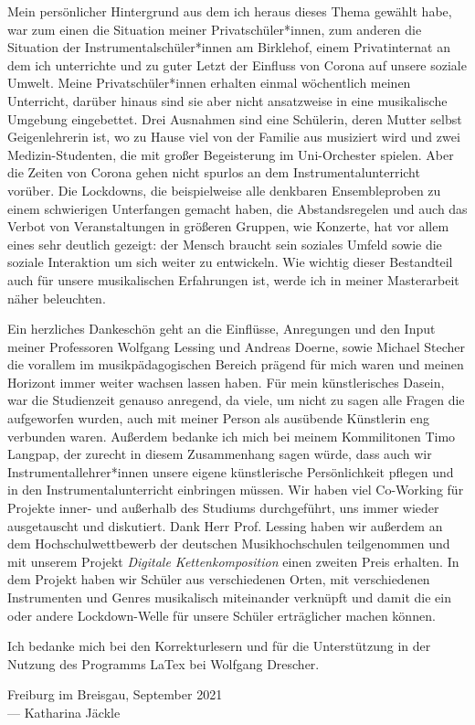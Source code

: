 
Mein persönlicher Hintergrund aus dem ich heraus dieses Thema gewählt habe, war
zum einen die Situation meiner Privatschüler*innen, zum anderen die Situation der
Instrumentalschüler*innen am Birklehof, einem Privatinternat an dem ich unterrichte
und zu guter Letzt der Einfluss von Corona auf unsere soziale Umwelt. Meine
Privatschüler*innen erhalten einmal wöchentlich meinen Unterricht, darüber hinaus sind
sie aber nicht ansatzweise in eine musikalische Umgebung eingebettet. Drei
Ausnahmen sind eine Schülerin, deren Mutter selbst Geigenlehrerin ist, wo zu
Hause viel von der Familie aus musiziert wird und zwei Medizin-Studenten, die
mit großer Begeisterung im Uni-Orchester spielen. Aber die Zeiten von Corona
gehen nicht spurlos an dem Instrumentalunterricht vorüber. Die Lockdowns, die
beispielweise alle denkbaren Ensembleproben zu einem schwierigen Unterfangen
gemacht haben, die Abstandsregelen und auch das Verbot von Veranstaltungen in
größeren Gruppen, wie Konzerte, hat vor allem eines sehr deutlich gezeigt: der
Mensch braucht sein soziales Umfeld sowie die soziale Interaktion um sich weiter
zu entwickeln. Wie wichtig dieser Bestandteil auch für unsere musikalischen
Erfahrungen ist, werde ich in meiner Masterarbeit näher beleuchten.

Ein herzliches Dankeschön geht an die Einflüsse, Anregungen und den Input meiner
Professoren Wolfgang Lessing und Andreas Doerne, sowie Michael Stecher die
vorallem im musikpädagogischen Bereich prägend für mich waren und meinen
Horizont immer weiter wachsen lassen haben. Für mein künstlerisches Dasein, war
die Studienzeit genauso anregend, da viele, um nicht zu sagen alle Fragen die
aufgeworfen wurden, auch mit meiner Person als ausübende Künstlerin eng
verbunden waren. Außerdem bedanke ich mich bei meinem Kommilitonen Timo Langpap,
der zurecht in diesem Zusammenhang sagen würde, dass auch wir Instrumentallehrer*innen
unsere eigene künstlerische Persönlichkeit pflegen und in den
Instrumentalunterricht einbringen müssen. Wir haben viel Co-Working für Projekte
inner- und außerhalb des Studiums durchgeführt, uns immer wieder ausgetauscht und
diskutiert.
Dank Herr Prof. Lessing haben wir außerdem an dem Hochschulwettbewerb der
deutschen Musikhochschulen teilgenommen und mit unserem Projekt \emph{Digitale
Kettenkomposition} einen zweiten Preis erhalten. In dem Projekt haben wir
Schüler aus verschiedenen Orten, mit verschiedenen Instrumenten und Genres
musikalisch miteinander verknüpft und damit die ein oder andere Lockdown-Welle
für unsere Schüler erträglicher machen können. 

Ich bedanke mich bei den Korrekturlesern und für die
Unterstützung in der Nutzung des Programms LaTex bei Wolfgang Drescher.




\vspace{0.5cm}

\begin{flushright}
	{
		\small
		Freiburg im Breisgau, September 2021\\
		--- Katharina Jäckle
	}
\end{flushright}
